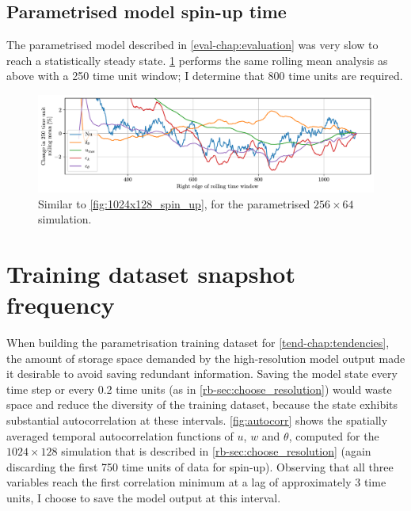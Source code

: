 \documentclass[../main.tex]{subfiles}
\begin{document}
\subsection{Parametrised model spin-up time} \label{sec:parametrised_spinup}
The parametrised model described in \cref{eval-chap:evaluation} was very slow
to reach a statistically steady state. \cref{fig:parametrised_spin_up} performs
the same rolling mean analysis as above with a 250 time unit window;
I determine that 800 time units are required.

\begin{figure}[ht]
    \centering
    \includegraphics[width=\linewidth]{figures/parametrised_spin_up.pdf}
    \caption{
        Similar to \cref{fig:1024x128_spin_up}, for the parametrised
        $256 \times 64$ simulation.
    }
    \label{fig:parametrised_spin_up}
\end{figure}


\clearpage
\section{Training dataset snapshot frequency} \label{sec:snapshot_freq}
When building the parametrisation training dataset for
\cref{tend-chap:tendencies}, the amount of storage space demanded by the
high-resolution model output made it desirable to avoid saving redundant
information. Saving the model state every time step or every 0.2 time units
(as in \cref{rb-sec:choose_resolution}) would waste space and reduce the
diversity of the training dataset, because the state exhibits substantial
autocorrelation at these intervals. \cref{fig:autocorr} shows the
spatially averaged temporal autocorrelation functions of $u$, $w$ and $\theta$,
computed for the $1024 \times 128$ simulation that is described in
\cref{rb-sec:choose_resolution} (again discarding the first 750 time units of
data for spin-up). Observing that all three variables reach the first
correlation minimum at a lag of approximately 3 time units, I choose to
save the model output at this interval.
\end{document}
